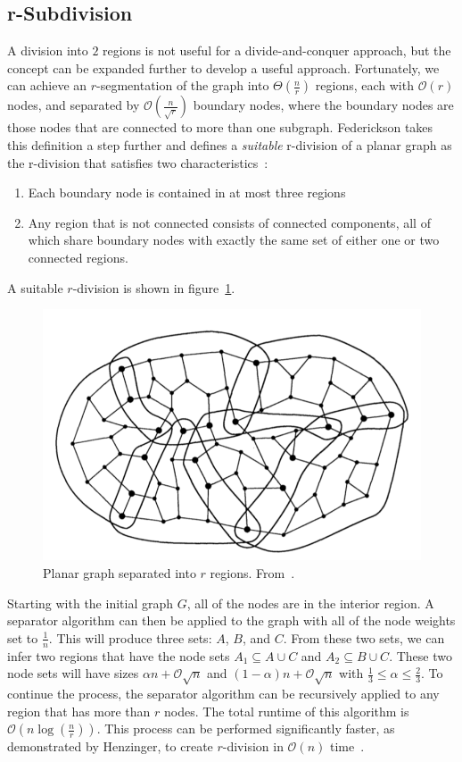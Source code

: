 \documentclass[11pt]{article}
\begin{document}
\subsection{r-Subdivision}
\label{sec:graph-sep-rsub}

A division into $2$ regions is not useful for a divide-and-conquer approach, but the concept can be expanded further to develop a useful approach. Fortunately, we can achieve an $r$-segmentation of the graph into $\Theta \left (\frac{n}{r} \right )$ regions, each with $\mathcal{O}(r)$ nodes, and separated by $\mathcal{O} \left (\frac{n}{\sqrt{r}} \right )$ boundary nodes, where the boundary nodes are those nodes that are connected to more than one subgraph. Federickson takes this definition a step further and defines a \textit{suitable} r-division of a planar graph as the r-division that satisfies two characteristics~\cite{federickson1987fast}:
\begin{enumerate}
    \item Each boundary node is contained in at most three regions

    \item Any region that is not connected consists of connected components, all of which share boundary nodes with exactly the same set of either one or two connected regions.
\end{enumerate}
A suitable $r$-division is shown in figure~\ref{fig:rsep}.

\begin{figure}[!htb]
    \centering
    \includegraphics[width=.4\textwidth]{rsep}
    \caption{Planar graph separated into $r$ regions. From~\cite{federickson1987fast}.}
    \label{fig:rsep}
\end{figure}

Starting with the initial graph $G$, all of the nodes are in the interior region. A separator algorithm can then be applied to the graph with all of the node weights set to $\frac{1}{n}$. This will produce three sets: $A$, $B$, and $C$. From these two sets, we can infer two regions that have the node sets $A_1 \subseteq A \cup C$ and $A_2 \subseteq B \cup C$. These two node sets will have sizes $\alpha n + \mathcal{O}\sqrt{n}$ and $(1 - \alpha) n + \mathcal{O}\sqrt{n}$ with $\frac{1}{3} \leq \alpha \leq \frac{2}{3}$. To continue the process, the separator algorithm can be recursively applied to any region that has more than $r$ nodes. The total runtime of this algorithm is $\mathcal{O} \left (n \log \left (\frac{n}{r} \right ) \right )$. This process can be performed significantly faster, as demonstrated by Henzinger, to create $r$-division in $\mathcal{O}(n)$ time~\cite{henzinger1997faster}.
\end{document}

